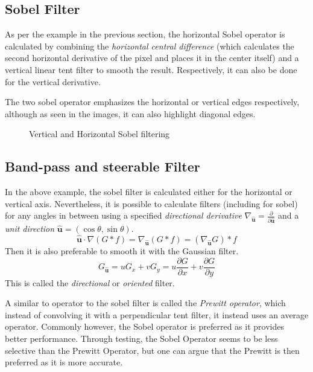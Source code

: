 \documentclass[twoside,a4paper,article]{combine}
\begin{document}
\subsection{Sobel Filter}
As per the example in the previous section, the horizontal Sobel operator is calculated by combining the \emph{horizontal central difference}
(which calculates the second horizontal derivative of the pixel and places it in the center itself) and a vertical linear tent filter to smooth the result. Respectively, it can also
be done for the vertical derivative.

The two sobel operator emphasizes the horizontal or vertical edges respectively, although as seen in the images, it can also highlight diagonal edges.\\
\begin{minipage}{\textwidth}\begin{figure}[H]
    \captionsetup{justification=centering}
    \centering
    \caption{Vertical and Horizontal Sobel filtering\cite{NASA_on_The_Commons_2023}}\label{fig:sobel}
\end{figure}\end{minipage}

\subsection{Band-pass and steerable Filter}
In the above example, the sobel filter is calculated either for the horizontal or
vertical axis. Nevertheless, it is possible to calculate filters (including for sobel) for any angles in between using a specified 
\emph{directional derivative} $\nabla_{\boldsymbol{\hat{u}}} = \frac{\partial}{\partial\boldsymbol{\hat{u}}}$ 
and a \emph{unit direction} $\boldsymbol{\hat{u}} = (\cos \theta, \sin \theta)$\cite{Szeliski_2022}.
\[
    \boldsymbol{\hat{u}} \cdot \nabla (G \ast f) = \nabla_{\boldsymbol{\hat{u}}}(G \ast f) = (\nabla_{\boldsymbol{\hat{u}}}G) \ast  f
\]
Then it is also preferable to smooth it with the Gaussian filter.
\[
    G_{\boldsymbol{\hat{u}}} = u G_x + v G_y = u \frac{\partial G}{\partial x} + v \frac{\partial G}{\partial y} 
\]
This is called the \emph{directional} or \emph{oriented} filter.

A similar to operator to the sobel filter is called the \emph{Prewitt operator}, which instead of convolving it with a perpendicular tent filter,
it instead uses an average operator. Commonly however, the Sobel operator is preferred as it provides better performance\cite{NIXON2020141}. Through testing, the Sobel Operator seems
to be less selective than the Prewitt Operator, but one can argue that the Prewitt is then preferred as it is more accurate.
\end{document}
